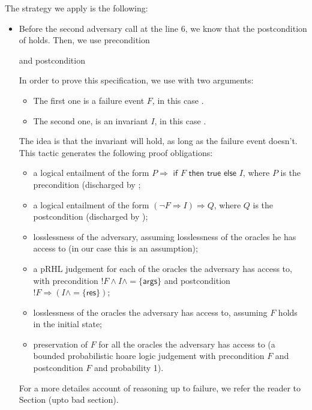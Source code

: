 The strategy we apply is the following:
\begin{itemize}
\item Before the second adversary call at the line 6, we know that the
  postcondition of  holds. Then, we use precondition


and postcondition 

In order to prove this specification, we use  with two
arguments:
\begin{itemize}
  \item The first one is a failure event $F$, in this case .
    \item The second one, is an invariant $I$, in this case 
      .
\end{itemize}
The idea is that the invariant will hold, as long as the failure event
doesn't. This tactic generates the following proof obligations:
\begin{itemize}
\item a logical entailment of the form $P \Rightarrow \textsf{ if } F
  \textsf{ then true else } I$, where $P$ is the precondition
  (discharged by ;

\item a logical entailment of the form $(\lnot F \Rightarrow
  I)\Rightarrow Q$, where $Q$ is the postcondition (discharged by
  );

\item losslessness of the adversary, assuming losslessness of the
  oracles he has access to (in our case this is an assumption);

\item a pRHL judgement for each of the oracles the adversary has
  access to, with precondition $!F \land I \land =\{\mathsf{args}\}$
  and postcondition $!F \Rightarrow (I \land=\{\mathsf{res}\})$;

\item losslessness of the oracles the adversary has access to,
  assuming $F$ holds in the initial state;

\item preservation of $F$ for all the oracles the adversary has access
  to (a bounded probabilistic hoare logic judgement with precondition
  $F$ and postcondition $F$ and probability 1).
\end{itemize}
For a more detailes account of reasoning up to failure, we refer the
reader to Section (upto bad section).



\end{itemize}
